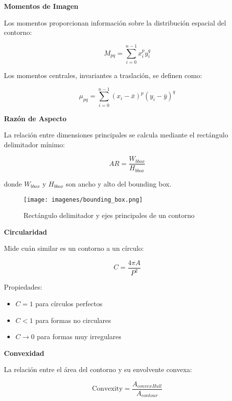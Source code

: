 \textbf{Momentos de Imagen}

Los momentos proporcionan información sobre la distribución espacial del contorno:

\begin{equation}
M_{pq} = \sum_{i=0}^{n-1} x_i^p y_i^q
\end{equation}

Los momentos centrales, invariantes a traslación, se definen como:

\begin{equation}
\mu_{pq} = \sum_{i=0}^{n-1} (x_i - \bar{x})^p (y_i - \bar{y})^q
\end{equation}

\textbf{Razón de Aspecto}

La relación entre dimensiones principales se calcula mediante el rectángulo delimitador mínimo:

\begin{equation}
AR = \frac{W_{bbox}}{H_{bbox}}
\end{equation}

donde $W_{bbox}$ y $H_{bbox}$ son ancho y alto del bounding box.

\begin{figure}[h]
\centering
\texttt{[image: imagenes/bounding\_box.png]}
\caption{Rectángulo delimitador y ejes principales de un contorno}
\label{fig:bounding_box}
\end{figure}

\textbf{Circularidad}

Mide cuán similar es un contorno a un círculo:

\begin{equation}
C = \frac{4\pi A}{P^2}
\end{equation}

Propiedades:
\begin{itemize}
\item $C = 1$ para círculos perfectos
\item $C < 1$ para formas no circulares
\item $C \to 0$ para formas muy irregulares
\end{itemize}

\textbf{Convexidad}

La relación entre el área del contorno y su envolvente convexa:

\begin{equation}
\text{Convexity} = \frac{A_{convexHull}}{A_{contour}}
\end{equation}

